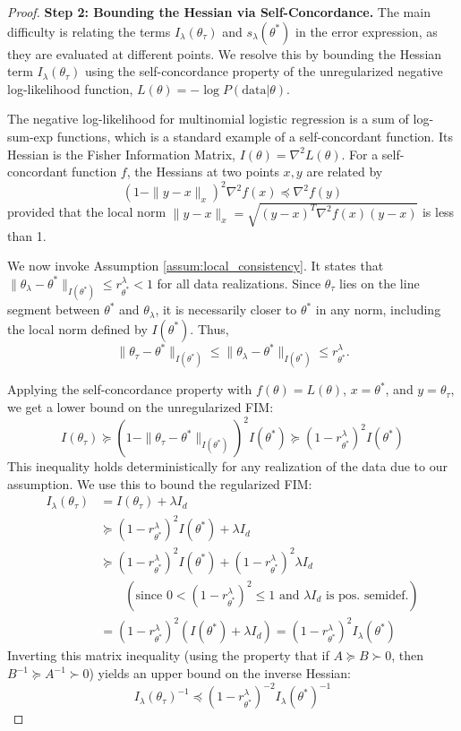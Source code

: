\documentclass{article}
\begin{document}
\begin{proof}
\textbf{Step 2: Bounding the Hessian via Self-Concordance.}
The main difficulty is relating the terms $I_\lambda(\theta_\tau)$ and $s_\lambda(\theta^*)$ in the error expression, as they are evaluated at different points. We resolve this by bounding the Hessian term $I_\lambda(\theta_\tau)$ using the self-concordance property of the unregularized negative log-likelihood function, $L(\theta) = -\log P(\text{data}|\theta)$.

The negative log-likelihood for multinomial logistic regression is a sum of log-sum-exp functions, which is a standard example of a self-concordant function. Its Hessian is the Fisher Information Matrix, $I(\theta) = \nabla^2 L(\theta)$. For a self-concordant function $f$, the Hessians at two points $x, y$ are related by
\[
(1 - \|y-x\|_x)^2 \nabla^2 f(x) \preceq \nabla^2 f(y)
\]
provided that the local norm $\|y-x\|_x = \sqrt{(y-x)^T \nabla^2 f(x) (y-x)}$ is less than 1.

We now invoke Assumption \ref{assum:local_consistency}. It states that $\|\theta_\lambda - \theta^*\|_{I(\theta^*)} \le r^{\lambda}_{\theta^*} < 1$ for all data realizations. Since $\theta_\tau$ lies on the line segment between $\theta^*$ and $\theta_\lambda$, it is necessarily closer to $\theta^*$ in any norm, including the local norm defined by $I(\theta^*)$. Thus,
\[
\|\theta_\tau - \theta^*\|_{I(\theta^*)} \le \|\theta_\lambda - \theta^*\|_{I(\theta^*)} \le r^{\lambda}_{\theta^*}.
\]

Applying the self-concordance property with $f(\theta)=L(\theta)$, $x=\theta^*$, and $y=\theta_\tau$, we get a lower bound on the unregularized FIM:
\[
I(\theta_\tau) \succeq (1 - \|\theta_\tau - \theta^*\|_{I(\theta^*)})^2 I(\theta^*) \succeq (1-r^{\lambda}_{\theta^*})^2 I(\theta^*)
\]
This inequality holds deterministically for any realization of the data due to our assumption. We use this to bound the regularized FIM:
\begin{align*}
I_\lambda(\theta_\tau) &= I(\theta_\tau) + \lambda I_d \\
&\succeq (1-r^{\lambda}_{\theta^*})^2 I(\theta^*) + \lambda I_d \\
&\succeq (1-r^{\lambda}_{\theta^*})^2 I(\theta^*) + (1-r^{\lambda}_{\theta^*})^2 \lambda I_d \\
&\qquad \left(\text{since } 0 < (1-r^{\lambda}_{\theta^*})^2 \le 1 \text{ and } \lambda I_d \text{ is pos.\ semidef.}\right) \\
&= (1-r^{\lambda}_{\theta^*})^2 (I(\theta^*) + \lambda I_d) = (1-r^{\lambda}_{\theta^*})^2 I_\lambda(\theta^*)
\end{align*}
Inverting this matrix inequality (using the property that if $A \succeq B \succ 0$, then $B^{-1} \succeq A^{-1} \succ 0$) yields an upper bound on the inverse Hessian:
\[
I_\lambda(\theta_\tau)^{-1} \preceq (1-r^{\lambda}_{\theta^*})^{-2} I_\lambda(\theta^*)^{-1}
\]


\end{proof}
\end{document}

